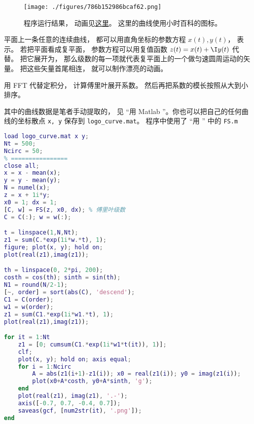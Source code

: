 
\begin{issues}
\issueDraft
\end{issues}


\begin{figure}[ht]
\centering
\texttt{[image: ./figures/786b152986bcaf62.png]}
\caption{程序运行结果， 动画见\href{https://wuli.wiki/apps/FFTplt.html}{这里}。 这里的曲线使用小时百科的图标。} \label{fig_FFTdrw_1}
\end{figure}

平面上一条任意的连续曲线， 都可以用直角坐标的参数方程 $x(t), y(t)$， 表示。 若把平面看成复平面， 参数方程可以用复值函数 $z(t) = x(t) + \I y(t)$ 代替。 把它展开为， 那么级数的每一项就代表复平面上的一个做匀速圆周运动的矢量。 把这些矢量首尾相连， 就可以制作漂亮的动画。

用 FFT 代替定积分， 计算傅里叶展开系数。 然后再把系数的模长按照从大到小排序。

其中的曲线数据是笔者手动提取的， 见 “用 Matlab ”。你也可以把自己的任何曲线的坐标散点 \verb|x, y| 保存到 \verb|logo_curve.mat|。 程序中使用了 “用 ” 中的 \verb|FS.m|

\begin{lstlisting}[language=matlab, caption=FFTplt.m]
% ==== 参数设置 ====
load logo_curve.mat x y;
Nt = 500;
Ncirc = 50;
% ================
close all;
x = x - mean(x);
y = y - mean(y);
N = numel(x);
z = x + 1i*y;
x0 = 1; dx = 1;
[C, w] = FS(z, x0, dx); % 傅里叶级数
C = C(:); w = w(:);

t = linspace(1,N,Nt);
z1 = sum(C.*exp(1i*w.*t), 1);
figure; plot(x, y); hold on;
plot(real(z1),imag(z1));

th = linspace(0, 2*pi, 200);
costh = cos(th); sinth = sin(th);
N1 = round(N/2-1);
[~, order] = sort(abs(C), 'descend');
C1 = C(order);
w1 = w(order);
z1 = sum(C1.*exp(1i*w1.*t), 1);
plot(real(z1),imag(z1));

for it = 1:Nt
    z1 = [0; cumsum(C1.*exp(1i*w1*t(it)), 1)];
    clf;
    plot(x, y); hold on; axis equal;
    for i = 1:Ncirc
        A = abs(z1(i+1)-z1(i)); x0 = real(z1(i)); y0 = imag(z1(i));
        plot(x0+A*costh, y0+A*sinth, 'g');
    end
    plot(real(z1), imag(z1), '.-');
    axis([-0.7, 0.7, -0.4, 0.7]);
    saveas(gcf, [num2str(it), '.png']);
end
\end{lstlisting}
